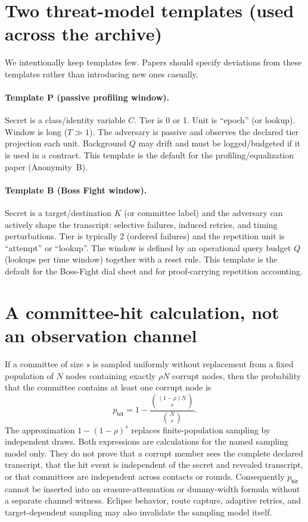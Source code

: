 \documentclass[11pt]{article}
\begin{document}
\section{Two threat-model templates (used across the archive)}\label{sec:templates}
We intentionally keep templates few.
Papers should specify deviations from these templates rather than introducing new ones casually.

\paragraph{Template P (passive profiling window).}
Secret is a class/identity variable $C$.
Tier is 0 or 1.
Unit is ``epoch'' (or lookup).
Window is long ($T\gg 1$).
The adversary is passive and observes the declared tier projection each unit.
Background $Q$ may drift and must be logged/budgeted if it is used in a contract.
This template is the default for the profiling/equalization paper (Anonymity~B).

\paragraph{Template B (Boss Fight window).}
Secret is a target/destination $K$ (or committee label) and the adversary can actively shape the transcript: selective failures, induced retries, and timing perturbations.
Tier is typically 2 (ordered failures) and the repetition unit is ``attempt'' or ``lookup''.
The window is defined by an operational query budget $Q$ (lookups per time window) together with a reset rule.
This template is the default for the Boss-Fight dial sheet and for proof-carrying repetition accounting.

\section{A committee-hit calculation, not an observation channel}\label{sec:pobs}
If a committee of size $s$ is sampled uniformly without replacement from a fixed population of $N$ nodes containing exactly $\rho N$ corrupt nodes, then the probability that the committee contains at least one corrupt node is
\[
 p_{\mathsf{hit}} = 1-\frac{\binom{(1-\rho)N}{s}}{\binom{N}{s}}.
\]
The approximation $1-(1-\rho)^s$ replaces finite-population sampling by independent draws. Both expressions are calculations for the named sampling model only. They do not prove that a corrupt member sees the complete declared transcript, that the hit event is independent of the secret and revealed transcript, or that committees are independent across contacts or rounds. Consequently $p_{\mathsf{hit}}$ cannot be inserted into an erasure-attenuation or dummy-width formula without a separate channel witness. Eclipse behavior, route capture, adaptive retries, and target-dependent sampling may also invalidate the sampling model itself.
\end{document}
